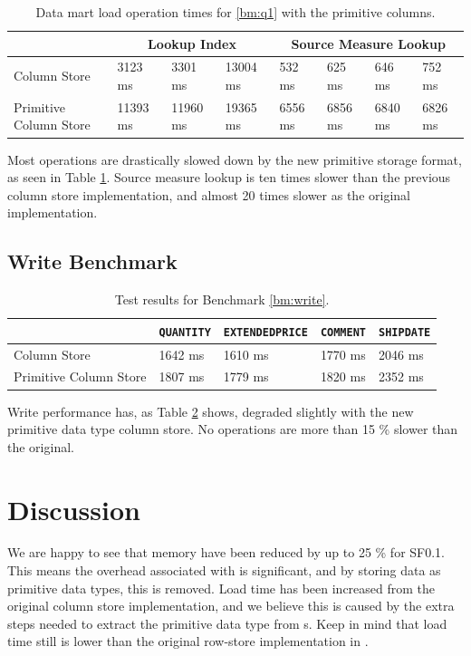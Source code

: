 \begin{table}
    \centering
    \begin{tabularx}{\textwidth}{X | X X X | X X X X}
        & \multicolumn{3}{c}{Lookup Index} & \multicolumn{4}{c}{Source Measure Lookup} \\
        \hline
        \hline
        Column Store & 3123 ms & 3301 ms & 13004 ms & 532 ms & 625 ms & 646 ms & 752 ms \\
        Primitive Column Store & 11393 ms & 11960 ms & 19365 ms & 6556 ms & 6856 ms & 6840 ms & 6826 ms \\
    \end{tabularx}
    \caption{Data mart load operation times for \ref{bm:q1} with the primitive columns.} 
    \label{tab:primitive-q1}
\end{table}
Most operations are drastically slowed down by the new primitive storage format, as seen in Table \ref{tab:primitive-q1}. Source measure lookup is ten times slower than the previous column store implementation, and almost 20 times slower as the original implementation.

\subsection{Write Benchmark}
\label{sub:Write Benchmark}
\begin{table}
    \begin{tabularx}{\textwidth}{X | X X X X}
         & \texttt{QUANTITY} & \texttt{EXTENDEDPRICE} & \texttt{COMMENT} & \texttt{SHIPDATE}\\ 
        \hline
        \hline
        Column Store & 1642 ms & 1610 ms & 1770 ms & 2046 ms \\
        Primitive Column Store & 1807 ms & 1779 ms & 1820 ms & 2352 ms \\
    \end{tabularx}
    \caption{Test results for Benchmark \ref{bm:write}.}
    \label{tab:primitive-write}
\end{table}
Write performance has, as Table \ref{tab:primitive-write} shows, degraded slightly with the new primitive data type column store. No operations are more than 15 \% slower than the original.

\section{Discussion}
\label{sec:part2-discussion}
We are happy to see that memory have been reduced by up to 25 \% for SF0.1. This means the overhead associated with  is significant, and by storing data as primitive data types, this is removed. Load time has been increased from the original column store implementation, and we believe this is caused by the extra steps needed to extract the primitive data type from s. Keep in mind that load time still is lower than the original row-store implementation in \gap.

